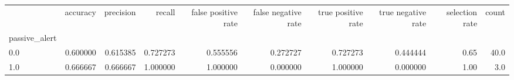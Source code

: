 \begin{tabular}{lrrrrrrrrr}
\toprule
{} &  accuracy &  precision &    recall &  false positive rate &  false negative rate &  true positive rate &  true negative rate &  selection rate &  count \\
passive\_alert &           &            &           &                      &                      &                     &                     &                 &        \\
\midrule
0.0           &  0.600000 &   0.615385 &  0.727273 &             0.555556 &             0.272727 &            0.727273 &            0.444444 &            0.65 &   40.0 \\
1.0           &  0.666667 &   0.666667 &  1.000000 &             1.000000 &             0.000000 &            1.000000 &            0.000000 &            1.00 &    3.0 \\
\bottomrule
\end{tabular}
